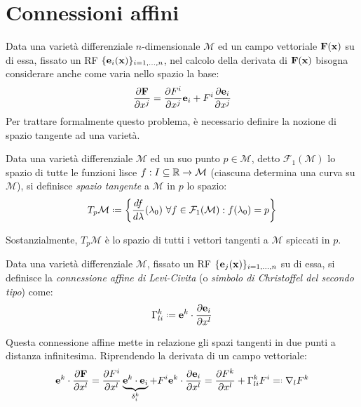 
\section{Connessioni affini}

Data una varietà differenziale $ n $-dimensionale $ \mathcal{M} $ ed un campo vettoriale $ \mathbf{F}(\mathbf{x}) $ su di essa, fissato un RF $ \{\mathbf{e}_i (\mathbf{x})\}_{i = 1, \dots, n} $, nel calcolo della derivata di $ \mathbf{F}(\mathbf{x}) $ bisogna considerare anche come varia nello spazio la base:
\begin{equation}
	\frac{\partial \mathbf{F}}{\partial x^j} = \frac{\partial F^i}{\partial x^j} \mathbf{e}_i + F^i \frac{\partial \mathbf{e}_i}{\partial x^j}
	\label{eq:4.1}
\end{equation}
Per trattare formalmente questo problema, è necessario definire la nozione di spazio tangente ad una varietà.
\begin{definition}
	Data una varietà differenziale $ \mathcal{M} $ ed un suo punto $ p \in \mathcal{M} $, detto $ \mathcal{F}_1(\mathcal{M}) $ lo spazio di tutte le funzioni lisce $ f : I \subseteq \mathbb{R} \rightarrow \mathcal{M} $ (ciascuna determina una curva su $ \mathcal{M} $), si definisce \textit{spazio tangente} a $ \mathcal{M} $ in $ p $ lo spazio:
	\begin{equation}
		T_p\mathcal{M} \defeq \biggl\{ \frac{df}{d\lambda}(\lambda_0) \,\,\forall f \in \mathcal{F}_1(\mathcal{M}) : f(\lambda_0) = p \biggl\}
		\label{eq:4.2}
	\end{equation}
\end{definition}
Sostanzialmente, $ T_p\mathcal{M} $ è lo spazio di tutti i vettori tangenti a $ \mathcal{M} $ spiccati in $ p $.
\begin{definition}
	Data una varietà differenziale $ \mathcal{M} $, fissato un RF $ \{\mathbf{e}_j(\mathbf{x})\}_{i = 1, \dots, n} $ su di essa, si definisce la \textit{connessione affine di Levi-Civita} (o \textit{simbolo di Christoffel del secondo tipo}) come:
	\begin{equation}
		\Gamma^k_{li} \defeq \ve{e}^k \cdot \frac{\pa \ve{e}_i}{\pa x^l}
		\label{eq:4.3}
	\end{equation}
\end{definition}
Questa connessione affine mette in relazione gli spazi tangenti in due punti a distanza infinitesima.
Riprendendo la derivata di un campo vettoriale:
\begin{equation}
	\ve{e}^k \cdot \frac{\pa \ve{F}}{\pa x^l} = \frac{\pa F^i}{\pa x^l} \underbrace{\ve{e}^k \cdot \ve{e}_i}_{\delta^k_i} + F^i \ve{e}^k \cdot \frac{\pa \ve{e}_i}{\pa x^l} = \frac{\pa F^k}{\pa x^l} + \Gamma^k_{li} F^i \eqdef \nabla_l F^k
	\label{eq:4.4}
\end{equation}
